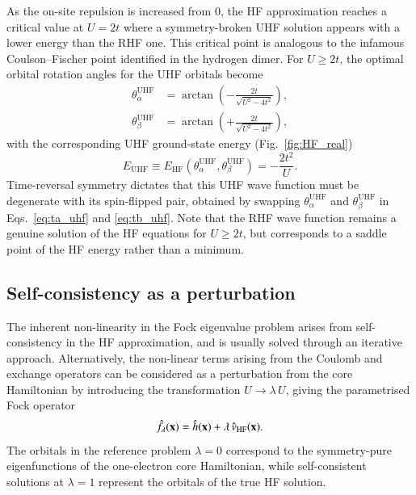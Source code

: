 \documentclass[aps,prb,reprint,noshowkeys,superscriptaddress]{revtex4-1}
\newcommand{\ta}{\theta_{\alpha}}
\newcommand{\tb}{\theta_{\beta}}
\begin{document}
As the on-site repulsion is increased from 0, the HF approximation reaches a critical value at $U=2t$ where a symmetry-broken 
UHF solution appears with a lower energy than the RHF one.
This critical point is analogous to the infamous Coulson--Fischer point identified in the hydrogen dimer.\cite{Coulson_1949}
For $U \ge 2t$, the optimal orbital rotation angles for the UHF orbitals become
\begin{align}
    \ta^\text{UHF} & = \arctan (-\frac{2t}{\sqrt{U^2 - 4t^2}}),
    \label{eq:ta_uhf}
	\\
    \tb^\text{UHF} & = \arctan (+\frac{2t}{\sqrt{U^2 - 4t^2}}),
    \label{eq:tb_uhf}
\end{align}
with the corresponding UHF ground-state energy (Fig.~\ref{fig:HF_real})
\begin{equation}
	E_\text{UHF} \equiv E_\text{HF}(\ta^\text{UHF}, \tb^\text{UHF}) = - \frac{2t^2}{U}.
\end{equation}
Time-reversal symmetry dictates that this UHF wave function must be degenerate with its spin-flipped pair, obtained 
by swapping $\ta^{\text{UHF}}$ and $\tb^{\text{UHF}}$ in Eqs.~\eqref{eq:ta_uhf} and \eqref{eq:tb_uhf}.
Note that the RHF wave function remains a genuine solution of the HF equations for $U \ge 2t$, but corresponds to a saddle point 
of the HF energy rather than a minimum.

\subsection{Self-consistency as a perturbation} %

The inherent non-linearity in the Fock eigenvalue problem arises from self-consistency 
in the HF approximation, and is usually solved through an iterative approach.\cite{SzaboBook}
Alternatively, the non-linear terms arising from the Coulomb and exchange operators can 
be considered as a perturbation from the core Hamiltonian by introducing the
transformation $U \rightarrow \lambda\, U$, giving the parametrised Fock operator 
\begin{equation}
    \Hat{f}_{\lambda}(\vb{x}) = \Hat{h}(\vb{x}) + \lambda\, \Hat{v}_\text{HF}(\vb{x}).
\end{equation}
The orbitals in the reference problem $\lambda=0$ correspond to the symmetry-pure eigenfunctions of the one-electron core
Hamiltonian, while self-consistent solutions at $\lambda = 1$ represent the orbitals of the true HF solution.
\end{document}
